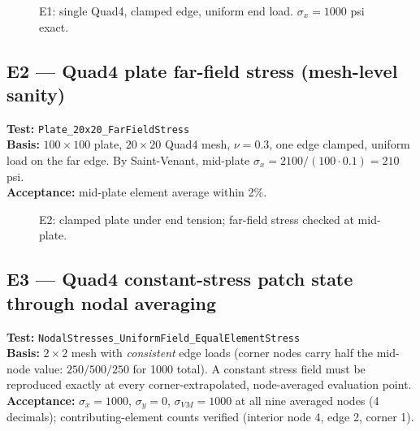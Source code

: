 \documentclass[11pt,a4paper]{article}
\newcommand{\wall}[3]{%
  \draw[thick] (#1,#2) -- (#1,#3);
  \fill[pattern=north east lines] (#1-0.18,#2) rectangle (#1,#3);
}
\begin{document}
\begin{figure}[H]\centering
{}
\caption{E1: single Quad4, clamped edge, uniform end load. $\sigma_x=1000$ psi exact.}
\end{figure}

\subsection{E2 --- Quad4 plate far-field stress (mesh-level sanity)}
\textbf{Test:} \texttt{Plate\_20x20\_FarFieldStress}\\
\textbf{Basis:} $100\times100$ plate, $20\times20$ Quad4 mesh, $\nu=0.3$,
one edge clamped, uniform load on the far edge. By Saint-Venant, mid-plate
$\sigma_x = 2100/(100\cdot 0.1) = 210$ psi.\\
\textbf{Acceptance:} mid-plate element average within 2\%.

\begin{figure}[H]\centering
{}
\caption{E2: clamped plate under end tension; far-field stress checked at mid-plate.}
\end{figure}

\subsection{E3 --- Quad4 constant-stress patch state through nodal averaging}
\textbf{Test:} \texttt{NodalStresses\_UniformField\_EqualElementStress}\\
\textbf{Basis:} $2\times2$ mesh with \emph{consistent} edge loads (corner
nodes carry half the mid-node value: $250/500/250$ for 1000 total). A
constant stress field must be reproduced exactly at every corner-extrapolated,
node-averaged evaluation point.\\
\textbf{Acceptance:} $\sigma_x=1000$, $\sigma_y=0$, $\sigma_{VM}=1000$ at all
nine averaged nodes (4 decimals); contributing-element counts verified
(interior node 4, edge 2, corner 1).
\end{document}
